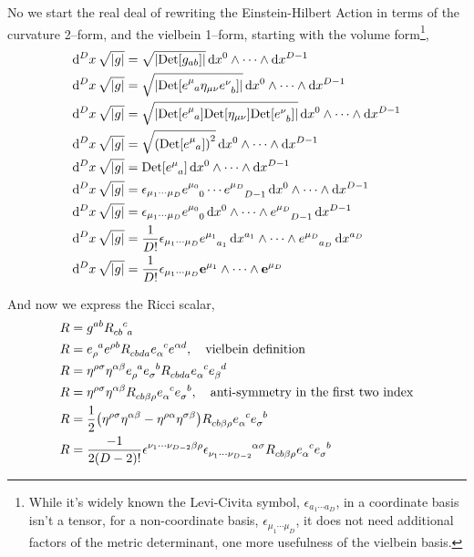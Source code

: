 No we start the real deal of rewriting the 
Einstein-Hilbert Action in terms of the curvature 2--form, and the vielbein 1--form, starting with the volume form\footnote{While it's widely known the Levi-Civita symbol, $\epsilon_{a_1\cdots a_D}$, in a coordinate basis isn't a tensor, 
for a non-coordinate basis, $\epsilon_{\mu_1\cdots\mu_D}$, it does not need additional factors of the metric determinant, one more usefulness of the vielbein basis.},
\begin{align*}
    \dd[D]{x}\sqrt{\abs{g}}&=\sqrt{\abs{\Det\qty[g_{ab}]}}\dd{x^0}\wedge\cdots\wedge\dd{x^{D-1}}\\
    \dd[D]{x}\sqrt{\abs{g}}&=\sqrt{\abs{\Det\qty[\tensor{e}{^\mu_a}\eta_{\mu\nu}\tensor{e}{^\nu_b}]}}\dd{x^0}\wedge\cdots\wedge\dd{x^{D-1}}\\
    \dd[D]{x}\sqrt{\abs{g}}&=\sqrt{\abs{\Det\qty[\tensor{e}{^\mu_a}]\Det\qty[\eta_{\mu\nu}]\Det\qty[\tensor{e}{^\nu_b}]}}\dd{x^0}\wedge\cdots\wedge\dd{x^{D-1}}\\
    \dd[D]{x}\sqrt{\abs{g}}&=\sqrt{\qty(\Det\qty[\tensor{e}{^\mu_a}])^2}\dd{x^0}\wedge\cdots\wedge\dd{x^{D-1}}\\
    \dd[D]{x}\sqrt{\abs{g}}&=\Det\qty[\tensor{e}{^\mu_a}]\dd{x^0}\wedge\cdots\wedge\dd{x^{D-1}}\\
    \dd[D]{x}\sqrt{\abs{g}}&=\epsilon_{\mu_1\cdots\mu_{D}}\tensor{e}{^{\mu_0}_0}\cdots\tensor{e}{^{\mu_{D}}_{D-1}}\dd{x^0}\wedge\cdots\wedge\dd{x^{D-1}}\\
    \dd[D]{x}\sqrt{\abs{g}}&=\epsilon_{\mu_1\cdots\mu_{D}}\tensor{e}{^{\mu_0}_0}\dd{x^0}\wedge\cdots\wedge\tensor{e}{^{\mu_{D}}_{D-1}}\dd{x^{D-1}}\\
    \dd[D]{x}\sqrt{\abs{g}}&=\frac{1}{D!}\epsilon_{\mu_1\cdots\mu_{D}}\tensor{e}{^{\mu_1}_{a_1}}\dd{x^{a_1}}\wedge\cdots\wedge\tensor{e}{^{\mu_{D}}_{a_{D}}}\dd{x^{a_{D}}}\\
    \dd[D]{x}\sqrt{\abs{g}}&=\frac{1}{D!}\epsilon_{\mu_1\cdots\mu_{D}}\vb e^{\mu_1}\wedge\cdots\wedge\vb e^{\mu_{D}}
\end{align*}

And now we express the Ricci scalar,
\begin{align*}
    R&=g^{ab}\tensor{R}{_c_b^c_a}\\
    R&=\tensor{e}{_\rho^a}\tensor{e}{^\rho^b}\tensor{R}{_c_b_d_a}\tensor{e}{_\alpha^c}\tensor{e}{^\alpha^d},\ \ \ \textnormal{vielbein definition}\\
    R&=\eta^{\rho\sigma}\eta^{\alpha\beta}\tensor{e}{_\rho^a}\tensor{e}{_\sigma^b}\tensor{R}{_c_b_d_a}\tensor{e}{_\alpha^c}\tensor{e}{_\beta^d}\\
    R&=\eta^{\rho\sigma}\eta^{\alpha\beta}\tensor{R}{_c_b_\beta_\rho}\tensor{e}{_\alpha^c}\tensor{e}{_\sigma^b},\ \ \ \textnormal{anti-symmetry in the first two index}\\
    R&=\frac12\qty(\eta^{\rho\sigma}\eta^{\alpha\beta}-\eta^{\rho\alpha}\eta^{\sigma\beta})\tensor{R}{_c_b_\beta_\rho}\tensor{e}{_\alpha^c}\tensor{e}{_\sigma^b}\\
    R&=\frac{-1}{2\qty(D-2)!}\tensor{\epsilon}{^{\nu_1}^\cdots^{\nu_{D-2}}^\beta^\rho}\tensor{\epsilon}{_{\nu_1}_\cdots_{\nu_{D-2}}^\alpha^\sigma}\tensor{R}{_c_b_\beta_\rho}\tensor{e}{_\alpha^c}\tensor{e}{_\sigma^b}
\end{align*}

